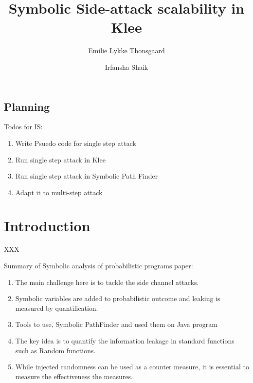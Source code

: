 \documentclass[11pt]{report}
\title{Symbolic Side-attack scalability in Klee}
\author{Emilie Lykke Thonsgaard \and Irfansha Shaik}
\begin{document}
\maketitle

\section{Planning}
\label{sec:planning}

Todos for IS:
\begin{enumerate}
\item Write Psuedo code for single step attack
\item Run single step attack in Klee
\item Run single step attack in Symbolic Path Finder
\item Adapt it to multi-step attack
\end{enumerate}

\chapter{Introduction}
\label{cha:introduction}

XXX

Summary of Symbolic analysis of probabilistic programs paper:
\begin{enumerate}
\item The main challenge here is to tackle the side channel attacks.
\item Symbolic variables are added to probabilistic outcome and leaking is measured by quantification.
\item Tools to use, Symbolic PathFinder and used them on Java program
\item The key idea is to quantify the information leakage in standard functions such as Random functions.
\item While injected randomness can be used as a counter measure, it is essential to measure the effectiveness the measures.
\end{enumerate}




\end{document}
